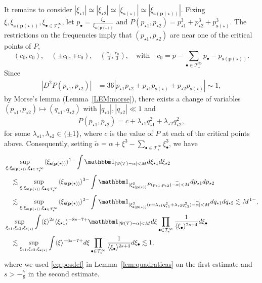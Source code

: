 \documentclass[a4paper,
11pt,  reqno]{amsart}
\newcommand{\5}{\textup{V}}
\newcommand{\ind}{\mathbbm 1}
\newcommand{\les}{\lesssim}
\newcommand{\wt}{\widetilde}
\theoremstyle{remark}
\newcommand{\bul}{\bullet}
\newcommand{\TT}{\mathcal{T}}
\newcommand{\al}{\alpha}
\newcommand{\ld}{\lambda}
\newcommand{\pb}{\mathbf{p}}
\newcommand{\sbf}{\mathbf{s}}
\newcommand{\jb}[1]
{\langle #1 \rangle}
\numberwithin{equation}{section}
\numberwithin{theorem}{section}
\begin{document}
It remains to consider $|\xi_{\star1}| \simeq |\xi_{\star2}| \simeq |\xi_{\sbf(\star)}| \simeq |\xi_{\sbf(\pb(\star))}| $.
Fixing $\xi, \xi_{\sbf(\pb(\star))}, \xi_{\bul\in\TT^\infty_\star}$, let $p_\bul = \frac{\xi_\bul}{\xi_{\sbf(\pb(\star))}}$ and $P(p_{\star1}, p_{\star2}) = p^3_{\star1} + p^3_{\star2} + p_{\sbf(\star)}^3$. The restrictions on the frequencies imply that $(p_{\star1},p_{\star2})$ are near one of the critical points of $P$,
$$(c_0,c_0), \quad (\pm c_0, \mp c_0), \quad (\tfrac{ c_0}{3}, \tfrac{ c_0}{3}), \quad \text{with} \quad c_0 = p - \sum_{\bul \in \TT^\infty_\star } p_\bul - p_{\sbf(\pb(\star))}.  $$
Since 
\begin{align}
    | D^2 P(p_{\star1}, p_{\star2}) | 
    &
    = 36 |p_{\star1} p_{\star2} + p_{\star1} p_{\sbf(\star)} + p_{\star2} p_{\sbf(\star)} | 
    \sim 1,
\end{align}
by Morse's lemma (Lemma~\ref{LEM:morse}), there exists a change of variables $(p_{\star1}, p_{\star2}) \mapsto (q_{\star1}, q_{\star2})$ with $|q_{\star1}|, |q_{\star2}| \ll 1$ and 
\begin{align}
    P(p_{\star1}, p_{\star2}) = c + \ld_{\star1} q_{\star1}^2 + \ld_{\star2} q_{\star2}^2, 
\end{align}
for some $\ld_{\star1}, \ld_{\star2} \in \{\pm1 \}$, 
{where $c$ is the value of $P$ at each of the critical points above.}
Consequently, setting $\wt\al = \al + \xi^3 - \sum_{\bul \in \TT^\infty_\star} \xi_\bul^3$, we have
\begin{align}
    & 
    \sup_{\xi,  \xi_{\sbf(\pb(\star))}, \xi_{\bul\in\TT^\infty_\star}}
     \jb{\xi_{\sbf(\pb(\star))}}^{1-}
     \int
    \ind_{|\Psi(\TT) - \al| < M } d \xi_{\star1} d\xi_{\star2} 
    \\
    &
    \quad 
    \les 
    \sup_{\xi, \xi_{\sbf(\pb(\star))}, \xi_{\bul\in\TT^\infty_\star}}
     \jb{\xi_{\sbf(\pb(\star))}}^{3-}
     \int
    \ind_{|\xi_{\sbf(\pb(\star))}^3 P(p_{\star1}, p_{ \star2}) - \wt\al| < M } d p_{\star1} dp_{\star2} 
    \\
    &
    \quad 
    \les 
    \sup_{\xi, \xi_{\sbf(\pb(\star))}, \xi_{\bul\in\TT^\infty_\star}}
     \jb{\xi_{\sbf(\pb(\star))}}^{3-}
     \int
    \ind_{|\xi_{\sbf(\pb(\star))}^3 ( c + \ld_{\star1} q_{\star1}^2 + \ld_{\star2} q_{\star2}^2) - \wt\al| < M } d q_{\star1} dq_{\star2} \les  
    M^{1-} , 
    \\
    &
    \sup_{\xi_{\star1}, \xi_{\star2}, {\xi_{\sbf(\star)} }}
    \int 
    \jb{\xi}^{2s} \jb{\xi_{\star1}}^{-8s - 7 +} \ind_{|\Psi(\TT) - \al| < M } d \xi \prod_{\bul\in \TT^\infty_\star} \frac{1}{\jb{\xi_\bul}^{2s+4}} d\xi_\bul 
    \\
    &
    \quad 
    \les 
    \sup_{\xi_{\star1}, \xi_{\star2}, {\xi_{\sbf(\star)} }}
    \int 
    \jb{\xi}^{-6s - 7 + }  d \xi \prod_{\bul\in \TT^\infty_\star} \frac{1}{\jb{\xi_\bul}^{2s+4}} d\xi_\bul \les 1, 
\end{align}
where we used \eqref{eq:posdef} in Lemma~\ref{lem:quadraticas} on the first estimate and $s>-\frac78$ in the second estimate. 
\end{document}
